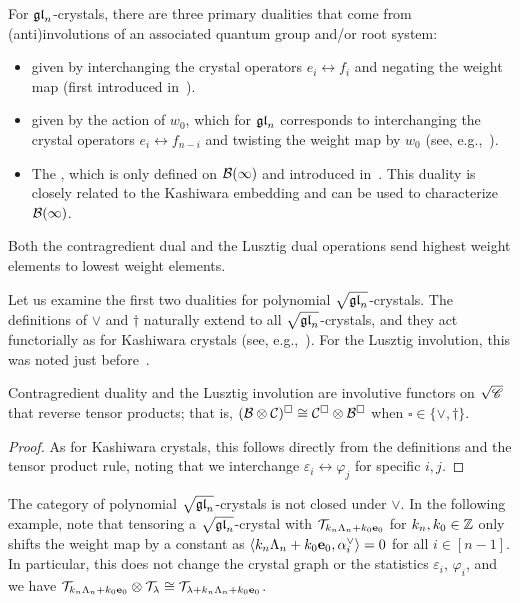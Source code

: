 \documentclass[11pt]{article}
\begin{document}
For $\mathfrak{gl}_n$-crystals, there are three primary dualities that come from (anti)involutions of an associated quantum group and/or root system:
\begin{itemize}
\item[$\vee$:]  given by interchanging the crystal operators $e_i \leftrightarrow f_i$ and negating the weight map (first introduced in~\cite{Kashiwara93}).

\item[$\dagger$:]  given by the action of $w_0$, which for $\mathfrak{gl}_n$ corresponds to interchanging the crystal operators $e_i \leftrightarrow f_{n-i}$ and twisting the weight map by $w_0$ (see, e.g.,~\cite{Lusztig93,Lenart07}).

\item[$*$:] The , which is only defined on $\mathcal{B}(\infty)$ and introduced in~\cite{Kashiwara93}.
  This duality is closely related to the Kashiwara embedding and can be used to characterize $\mathcal{B}(\infty)$.
\end{itemize}

Both the contragredient dual and the Lusztig dual operations send highest weight elements to lowest weight elements.

Let us examine the first two dualities for polynomial $\sqrt{\mathfrak{gl}_n}$-crystals.
The definitions of $\vee$ and $\dagger$ naturally extend to all $\sqrt{\mathfrak{gl}_n}$-crystals, and they act functorially as for Kashiwara crystals (see, e.g.,~\cite{Kashiwara95,Lenart07}).
For the Lusztig involution, this was noted just before~\cite[Prop.~4.41]{MT2023}.

\begin{proposition}
Contragredient duality and the Lusztig involution are involutive functors on $\sqrt{\mathscr{C}}$ that reverse tensor products; that is, $(\mathcal{B} \otimes \mathcal{C})^{\square} \cong \mathcal{C}^{\square} \otimes \mathcal{B}^{\square}$ when $\square \in\{ \vee, \dagger\}$.
\end{proposition}

\begin{proof}
As for Kashiwara crystals, this follows directly from the definitions and the tensor product rule, noting that we interchange $\varepsilon_i \leftrightarrow \varphi_j$ for specific $i, j$.
\end{proof}

The category of polynomial $\sqrt{\mathfrak{gl}_n}$-crystals is not closed under $\vee$.
In the following example, note that tensoring a $\sqrt{\mathfrak{gl}_n}$-crystal with $\mathcal{T}_{k_n \Lambda_n + k_0 \textbf{e}_0}$ for $k_n ,k_0 \in \mathbb{Z}$  only shifts the weight map by a constant as $\langle k_n \Lambda_n + k_0 \textbf{e}_0, \alpha_i^{\vee} \rangle = 0$ for all $i \in [n-1]$.
In particular, this does not change the crystal graph or the statistics $\varepsilon_i$, $\varphi_i$,
and we have $\mathcal{T}_{k_n \Lambda_n + k_0 \textbf{e}_0} \otimes \mathcal{T}_\lambda \cong \mathcal{T}_{\lambda + k_n \Lambda_n + k_0 \textbf{e}_0}$.
\end{document}
